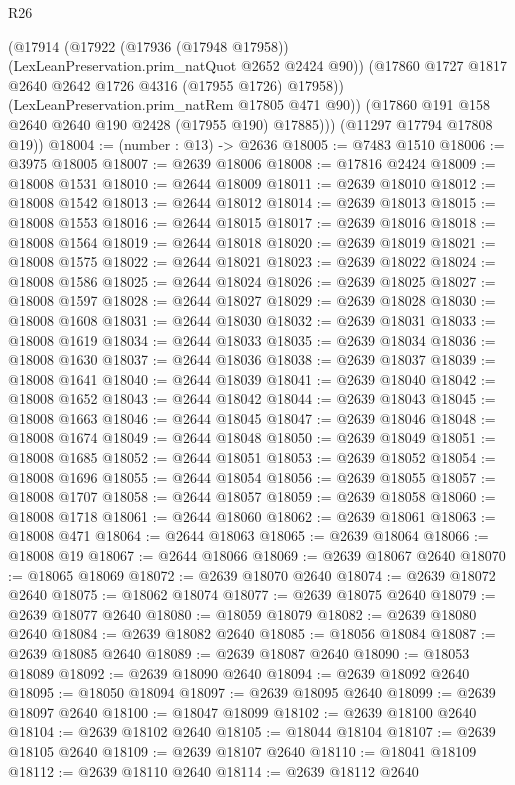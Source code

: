 \begin{lexlean}{R26}
\begin{coremodule}
            (@17914
              (@17922 (@17936 (@17948 @17958)) (LexLeanPreservation.prim_natQuot @2652 @2424 @90))
              (@17860 @1727 @1817 @2640 @2642 @1726 @4316 (@17955 @1726) @17958))
            (LexLeanPreservation.prim_natRem @17805 @471 @90))
          (@17860 @191 @158 @2640 @2640 @190 @2428 (@17955 @190) @17885)))
      (@11297 @17794 @17808 @19))
@18004 := (number : @13) -> @2636
@18005 := @7483 @1510
@18006 := @3975 @18005
@18007 := @2639 @18006
@18008 := @17816 @2424
@18009 := @18008 @1531
@18010 := @2644 @18009
@18011 := @2639 @18010
@18012 := @18008 @1542
@18013 := @2644 @18012
@18014 := @2639 @18013
@18015 := @18008 @1553
@18016 := @2644 @18015
@18017 := @2639 @18016
@18018 := @18008 @1564
@18019 := @2644 @18018
@18020 := @2639 @18019
@18021 := @18008 @1575
@18022 := @2644 @18021
@18023 := @2639 @18022
@18024 := @18008 @1586
@18025 := @2644 @18024
@18026 := @2639 @18025
@18027 := @18008 @1597
@18028 := @2644 @18027
@18029 := @2639 @18028
@18030 := @18008 @1608
@18031 := @2644 @18030
@18032 := @2639 @18031
@18033 := @18008 @1619
@18034 := @2644 @18033
@18035 := @2639 @18034
@18036 := @18008 @1630
@18037 := @2644 @18036
@18038 := @2639 @18037
@18039 := @18008 @1641
@18040 := @2644 @18039
@18041 := @2639 @18040
@18042 := @18008 @1652
@18043 := @2644 @18042
@18044 := @2639 @18043
@18045 := @18008 @1663
@18046 := @2644 @18045
@18047 := @2639 @18046
@18048 := @18008 @1674
@18049 := @2644 @18048
@18050 := @2639 @18049
@18051 := @18008 @1685
@18052 := @2644 @18051
@18053 := @2639 @18052
@18054 := @18008 @1696
@18055 := @2644 @18054
@18056 := @2639 @18055
@18057 := @18008 @1707
@18058 := @2644 @18057
@18059 := @2639 @18058
@18060 := @18008 @1718
@18061 := @2644 @18060
@18062 := @2639 @18061
@18063 := @18008 @471
@18064 := @2644 @18063
@18065 := @2639 @18064
@18066 := @18008 @19
@18067 := @2644 @18066
@18069 := @2639 @18067 @2640
@18070 := @18065 @18069
@18072 := @2639 @18070 @2640
@18074 := @2639 @18072 @2640
@18075 := @18062 @18074
@18077 := @2639 @18075 @2640
@18079 := @2639 @18077 @2640
@18080 := @18059 @18079
@18082 := @2639 @18080 @2640
@18084 := @2639 @18082 @2640
@18085 := @18056 @18084
@18087 := @2639 @18085 @2640
@18089 := @2639 @18087 @2640
@18090 := @18053 @18089
@18092 := @2639 @18090 @2640
@18094 := @2639 @18092 @2640
@18095 := @18050 @18094
@18097 := @2639 @18095 @2640
@18099 := @2639 @18097 @2640
@18100 := @18047 @18099
@18102 := @2639 @18100 @2640
@18104 := @2639 @18102 @2640
@18105 := @18044 @18104
@18107 := @2639 @18105 @2640
@18109 := @2639 @18107 @2640
@18110 := @18041 @18109
@18112 := @2639 @18110 @2640
@18114 := @2639 @18112 @2640

\end{coremodule}
\end{lexlean}
